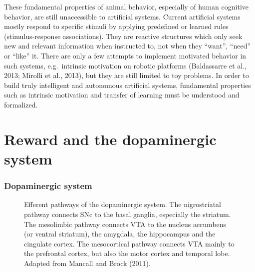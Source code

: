 \documentclass[
  11pt,
  a4paper,
]{scrbook}
\begin{document}
These fundamental properties of animal behavior, especially of human
cognitive behavior, are still unaccessible to artificial systems.
Current artificial systems mostly respond to specific stimuli by
applying predefined or learned rules (stimulus-response associations).
They are reactive structures which only seek new and relevant
information when instructed to, not when they ``want'', ``need'' or
``like'' it. There are only a few attempts to implement motivated
behavior in such systems, e.g.~intrinsic motivation on robotic platforms
(Baldassarre et al., 2013; Mirolli et al., 2013), but they are still
limited to toy problems. In order to build truly intelligent and
autonomous artificial systems, fundamental properties such as intrinsic
motivation and transfer of learning must be understood and formalized.

\section{Reward and the dopaminergic
system}\label{reward-and-the-dopaminergic-system}

\subsubsection*{Dopaminergic system}\label{dopaminergic-system}

\begin{figure}


\caption{\label{fig-intro:daprojection}Efferent pathways of the
dopaminergic system. The nigrostriatal pathway connects SNc to the basal
ganglia, especially the striatum. The mesolimbic pathway connects VTA to
the nucleus accumbens (or ventral striatum), the amygdala, the
hippocampus and the cingulate cortex. The mesocortical pathway connects
VTA mainly to the prefrontal cortex, but also the motor cortex and
temporal lobe. Adapted from Mancall and Brock (2011).}

\end{figure}%
\end{document}
